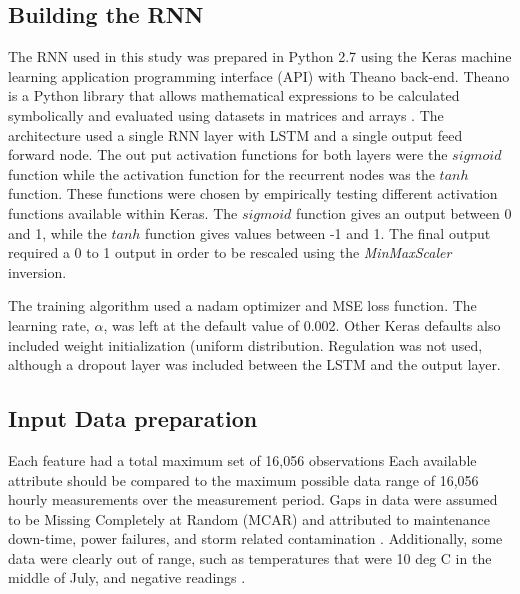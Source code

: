 \documentclass[preprint,12pt,authoryear]{elsarticle}
\begin{document}
\begin{linenumbers}
\subsection{Building the RNN}
The RNN used in this study was prepared in Python 2.7 using the Keras machine learning application programming interface (API) \citep{keras2015} with Theano back-end. Theano is a Python library that allows mathematical expressions to be calculated symbolically and evaluated using datasets in matrices and arrays \citep{Al-Rfou2016}. The architecture used a single RNN layer with LSTM and a single output feed forward node. The out put activation functions for both layers were the $sigmoid$ function while the activation function for the recurrent nodes was the $tanh$ function. These functions were chosen by empirically testing different activation functions available within Keras. The $sigmoid$ function gives an output between 0 and 1, while the $tanh$ function gives values between -1 and 1. The final output required a 0 to 1 output in order to be rescaled using the \emph{MinMaxScaler} inversion.

The training algorithm used a nadam optimizer and MSE loss function. The learning rate, $\alpha$, was left at the default value of 0.002. Other Keras defaults also included weight initialization (uniform distribution. Regulation was not used, although a dropout layer was included between the LSTM and the output layer. 

\subsection{Input Data preparation}
Each feature had a total maximum set of 16,056 observations Each available attribute should be compared to the maximum possible data range of 16,056 hourly measurements over the measurement period. Gaps in data were assumed to be Missing Completely at Random (MCAR) and attributed to maintenance down-time, power failures, and storm related contamination \citep{Le2007}. Additionally, some data were clearly out of range, such as temperatures that were 10 deg C in the middle of July, and negative readings \citep{Junger2015}.


\end{linenumbers}
\end{document}
